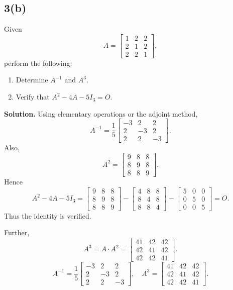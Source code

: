 \documentclass[11pt,a4paper]{article}
\newcommand{\ans}{\textbf{Solution.} }
\newcommand{\final}[1]{\[\boxed{#1}\]}
\begin{document}
\subsection*{3(b)}
\begin{questionbox}
Given
\[
A=\begin{bmatrix}1&2&2\\2&1&2\\2&2&1\end{bmatrix},
\]
perform the following:
\begin{enumerate}[label=(\roman*)]
\item Determine $A^{-1}$ and $A^3$.
\item Verify that $A^2-4A-5I_3=O$.
\end{enumerate}
\end{questionbox}
\ans
Using elementary operations or the adjoint method,
\[
A^{-1}=\frac15
\begin{bmatrix}
-3&2&2\\2&-3&2\\2&2&-3
\end{bmatrix}.
\]
Also,
\[
A^2=\begin{bmatrix}9&8&8\\8&9&8\\8&8&9\end{bmatrix}.
\]
Hence
\[
A^2-4A-5I_3
=
\begin{bmatrix}9&8&8\\8&9&8\\8&8&9\end{bmatrix}
-
\begin{bmatrix}4&8&8\\8&4&8\\8&8&4\end{bmatrix}
-
\begin{bmatrix}5&0&0\\0&5&0\\0&0&5\end{bmatrix}=O.
\]
Thus the identity is verified.

Further,
\[
A^3=A\cdot A^2
=\begin{bmatrix}
41&42&42\\42&41&42\\42&42&41
\end{bmatrix}.
\]
\final{A^{-1}=\frac15\begin{bmatrix}-3&2&2\\2&-3&2\\2&2&-3\end{bmatrix},\quad
A^3=\begin{bmatrix}41&42&42\\42&41&42\\42&42&41\end{bmatrix}.}
\end{document}
